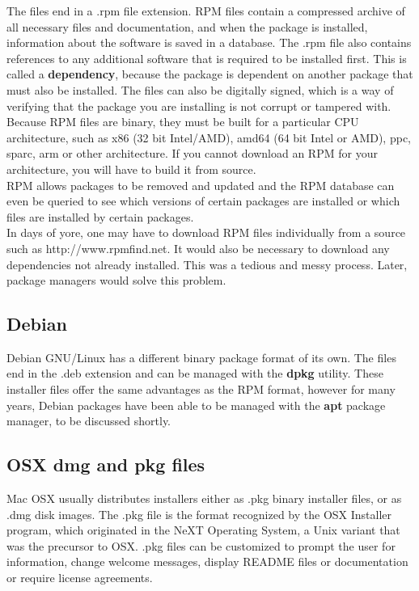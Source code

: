 The files end in a .rpm file extension.  RPM files contain a compressed archive of all necessary files and documentation, and when the package is installed, information about the software is saved in a database.  The .rpm file also contains references to any additional software that is required to be installed first.  This is called a \textbf{dependency}, because the package is dependent on another package that must also be installed.  The files can also be digitally signed, which is a way of verifying that the package you are installing is not corrupt or tampered with.\\

Because RPM files are binary, they must be built for a particular CPU architecture, such as x86 (32 bit Intel/AMD), amd64 (64 bit Intel or AMD), ppc, sparc, arm or other architecture.  If you cannot download an RPM for your architecture, you will have to build it from source.\\

RPM allows packages to be removed and updated and the RPM database can even be queried to see which versions of certain packages are installed or which files are installed by certain packages.\\

In days of yore, one may have to download RPM files individually from a source such as http://www.rpmfind.net.  It would also be necessary to download any dependencies not already installed.  This was a tedious and messy process.  Later, package managers would solve this problem.

\subsection{Debian}

Debian GNU/Linux has a different binary package format of its own.  The files end in the .deb extension and can be managed with the \textbf{dpkg} utility.  These installer files offer the same advantages as the RPM format, however for many years, Debian packages have been able to be managed with the \textbf{apt} package manager, to be discussed shortly.

\subsection{OSX dmg and pkg files}

Mac OSX usually distributes installers either as .pkg binary installer files, or as .dmg disk images.  The .pkg file is the format recognized by the OSX Installer program, which originated in the NeXT Operating System, a Unix variant that was the precursor to OSX.  .pkg files can be customized to prompt the user for information, change welcome messages, display README files or documentation or require license agreements.\\

